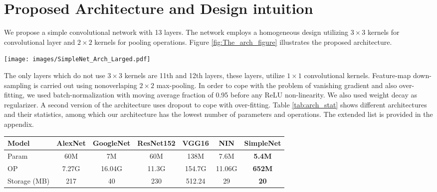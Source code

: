 \documentclass{article} \usepackage{lets_keepit_simple,times}
\begin{document}
\section{Proposed Architecture and Design intuition} \label{sec:arch}
We propose a simple convolutional network with 13 layers. The network employs a homogeneous design utilizing $3 \times 3$ kernels for convolutional layer and $2 \times 2$ kernels for pooling operations. Figure \ref{fig:The_arch_figure} illustrates the proposed architecture.

\begin{figure*}[h]
\begin{center}
\texttt{[image: images/SimpleNet\_Arch\_Larged.pdf]}
\end{center}
 \caption{Showing the base architecture with no drop-out}
\label{fig:The_arch_figure}
\end{figure*}



The only layers which do not use $3 \times 3$ kernels are 11th and 12th layers, these layers, utilize $1 \times 1$ convolutional kernels. Feature-map down-sampling is carried out using nonoverlaping $2 \times 2$ max-pooling. In order to cope with the problem of vanishing gradient and also over-fitting, we used batch-normalization with moving average fraction of 0.95 before any ReLU non-linearity. We also used weight decay as regularizer. A second version of the architecture uses dropout to cope with over-fitting. Table \ref{tab:arch_stat} shows different architectures and their statistics, among which our architecture has the lowest number of parameters and operations. The extended list is provided in the appendix.


\begin{table*}[h!]
\caption{showing different architectures statistics}
\begin{center}
\begin{tabular}{lcccccc}
Model & AlexNet & GoogleNet & ResNet152 & VGG16 & NIN & \textbf{SimpleNet} \\
\hline
Param & 60M & 7M & 60M	& 138M	& 7.6M	& \textbf{5.4M}\\
OP &7.27G & 16.04G & 11.3G & 154.7G &	11.06G & \textbf{652M}\\
Storage (MB) &217 & 40 & 230 & 512.24 & 29 & \textbf{20}\\
\hline
\end{tabular}
\end{center}
\label{tab:arch_stat}
\end{table*}
\end{document}
